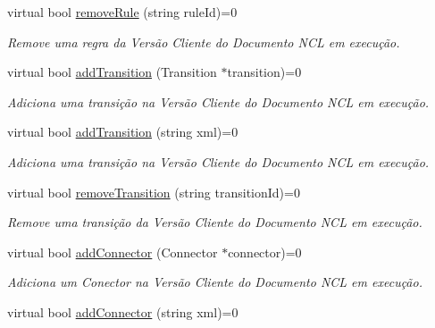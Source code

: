 \begin{DoxyCompactItemize}
virtual bool \hyperlink{classbr_1_1ufscar_1_1lince_1_1ginga_1_1wac_1_1editing_1_1IClientEditing_a1b9bb86e478437909dd6f5a77f2ff4b4}{removeRule} (string ruleId)=0
\begin{DoxyCompactList}\small\item\em Remove uma regra da Versão Cliente do Documento NCL em execução. \item\end{DoxyCompactList}\item 
virtual bool \hyperlink{classbr_1_1ufscar_1_1lince_1_1ginga_1_1wac_1_1editing_1_1IClientEditing_a8de701b01f8095605897a83002ea9fb0}{addTransition} (Transition $\ast$transition)=0
\begin{DoxyCompactList}\small\item\em Adiciona uma transição na Versão Cliente do Documento NCL em execução. \item\end{DoxyCompactList}\item 
virtual bool \hyperlink{classbr_1_1ufscar_1_1lince_1_1ginga_1_1wac_1_1editing_1_1IClientEditing_ab485ec1908e00b24e451f138446885af}{addTransition} (string xml)=0
\begin{DoxyCompactList}\small\item\em Adiciona uma transição na Versão Cliente do Documento NCL em execução. \item\end{DoxyCompactList}\item 
virtual bool \hyperlink{classbr_1_1ufscar_1_1lince_1_1ginga_1_1wac_1_1editing_1_1IClientEditing_a4f88db31bb7d754489e7cc965d9035c2}{removeTransition} (string transitionId)=0
\begin{DoxyCompactList}\small\item\em Remove uma transição da Versão Cliente do Documento NCL em execução. \item\end{DoxyCompactList}\item 
virtual bool \hyperlink{classbr_1_1ufscar_1_1lince_1_1ginga_1_1wac_1_1editing_1_1IClientEditing_ac3ce7f9f55bc61cb7166b741a73e77d9}{addConnector} (Connector $\ast$connector)=0
\begin{DoxyCompactList}\small\item\em Adiciona um Conector na Versão Cliente do Documento NCL em execução. \item\end{DoxyCompactList}\item 
virtual bool \hyperlink{classbr_1_1ufscar_1_1lince_1_1ginga_1_1wac_1_1editing_1_1IClientEditing_a531eb37bc22963dcb2feeed0e07591bd}{addConnector} (string xml)=0

\end{DoxyCompactItemize}
